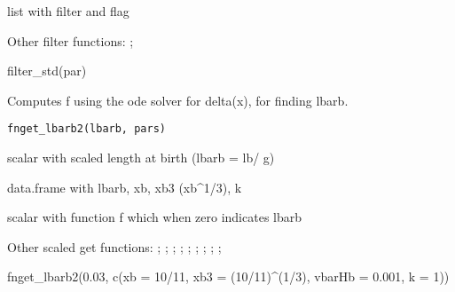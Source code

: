 \documentclass[a4paper]{book}
\begin{document}
%
\begin{Value}
list with filter and flag
\end{Value}
%
\begin{SeeAlso}\relax
Other filter functions: ;
\end{SeeAlso}
%
\begin{Examples}
\begin{ExampleCode}
filter_std(par)
\end{ExampleCode}
\end{Examples}
%
\begin{Description}\relax
Computes f using the ode solver for delta(x), for finding lbarb.
\end{Description}
%
\begin{Usage}
\begin{verbatim}
fnget_lbarb2(lbarb, pars)
\end{verbatim}
\end{Usage}
%
\begin{Arguments}
\begin{ldescription}
\item[\code{lbarb}] scalar with scaled length at birth (lbarb = lb/ g)

\item[\code{pars}] data.frame with lbarb, xb, xb3 (xb\textasciicircum{}1/3), k
\end{ldescription}
\end{Arguments}
%
\begin{Value}
scalar with function f which when zero indicates lbarb
\end{Value}
%
\begin{SeeAlso}\relax
Other scaled get functions: ;
; ;
; ;
; ;
;
;
\end{SeeAlso}
%
\begin{Examples}
\begin{ExampleCode}
fnget_lbarb2(0.03, c(xb = 10/11, xb3 = (10/11)^(1/3), vbarHb = 0.001, k = 1))
\end{ExampleCode}
\end{Examples}
\end{document}
